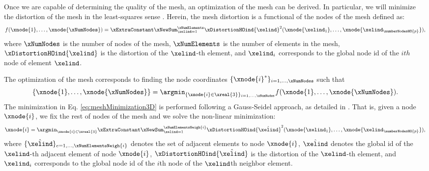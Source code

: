 \documentclass[1p]{elsarticle}
\begin{document}
Once we are capable of determining the quality of the mesh, an optimization of the mesh can be derived.
In particular, we will minimize the distortion of the mesh in the least-squares sense \cite{gargallo:generation3Doptimization}.
Herein, the mesh distortion is a functional of the nodes of the mesh defined as:
\begin{equation}
	\label{eq:leastSquares3D}
	f(\xnode{1},\ldots,\xnode{\xNumNodes})=
	\xExtraConstant 
	\xNewSum_{\xelind=1}^{\xNumElements}
	\xDistortionHOind{\xelind}^2(\xnode{{\xelind}_1},\ldots,\xnode{{\xelind}_\numberNodesHO{p}}),
\end{equation}
where $\xNumNodes$ is the number of nodes of the mesh, $\xNumElements$ is the number of elements in the mesh, $\xDistortionHOind{\xelind}$ is the distortion of the $\xelind$-th element, and  $\xelind_i$ corresponds to the global node id of the $ith$ node of element $\xelind$. 

The optimization of the mesh corresponds to finding the node coordinates $\{\xnode{i}^*\}_{i=1,\ldots,\xNumNodes}$ such that
\begin{equation}
\label{eq:meshMinimization3D}
\{\xnode{1},\ldots,\xnode{\xNumNodes}\}
=
\argmin_{ \{\xnode{i}\in\xreal{3}\}_{i=1,\ldots,\xNumNodes}}
f(\xnode{1},\ldots,\xnode{\xNumNodes}).
\end{equation}
The minimization in Eq. \eqref{eq:meshMinimization3D} is performed following a Gauss-Seidel approach, as detailed in \cite{gargallo:generation3Doptimization}. That is, given a node $\xnode{i}$, we fix the rest of nodes of the mesh and we solve the non-linear minimization:
\begin{equation}
	\label{eq:leastSquaresNode}
	\xnode{i} =
	\argmin_{\xnode{i}\in\xreal{3}}
	\xExtraConstant 
	\xNewSum_{\xelind=1}^{\xNumElementsNeigh{i}}
	\xDistortionHOind{\hat{\xelind}}^2(\xnode{{\xelind}_1},\ldots,\xnode{{\xelind}_\numberNodesHO{p}})
	,
\end{equation}
where $\{{\hat{\xelind}}\}_{e=1,\ldots,\xNumElementsNeigh{i}}$ denotes the set of adjacent elements to node $\xnode{i}$, $\hat{\xelind}$ denotes the global id of the ${\xelind}$-th adjacent element of node $\xnode{i}$, $\xDistortionHOind{\hat{\xelind}}$ is the distortion of the ${\xelind}$-th element, and  ${\xelind}_i$ corresponds to the global node id of the $i$th node of the ${\xelind}$th neighbor element.
\end{document}
